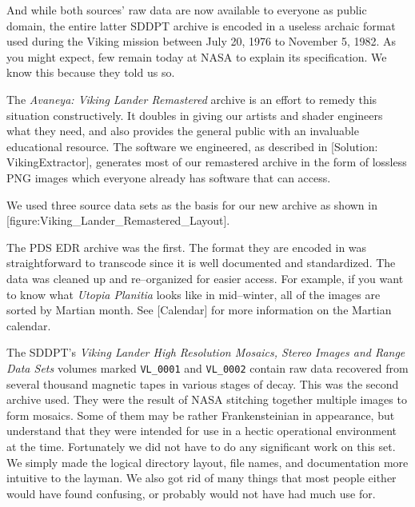 And while both sources' raw data are now available to everyone as public domain, the entire latter SDDPT archive is encoded in a useless archaic format used during the Viking mission between July 20, 1976 to November 5, 1982. As you might expect, few remain today at NASA to explain its specification. We know this because they told us so.

The {\it Avaneya: Viking Lander Remastered} archive is an effort to remedy this situation constructively. It doubles in giving our artists and shader engineers what they need, and also provides the general public with an invaluable educational resource. The software we engineered, as described in [Solution: VikingExtractor], generates most of our remastered archive in the form of lossless PNG images which everyone already has software that can access.

We used three source data sets as the basis for our new archive as shown in [figure:Viking_Lander_Remastered_Layout].
\crlf

    {}

The PDS EDR archive was the first. The format they are encoded in was straightforward to transcode since it is well documented and standardized. The data was cleaned up and re--organized for easier access. For example, if you want to know what {\it Utopia Planitia} looks like in mid--winter, all of the images are sorted by Martian month. See [Calendar] for more information on the Martian calendar.

The SDDPT's {\it Viking Lander High Resolution Mosaics, Stereo Images and Range Data Sets} volumes marked {\tt VL_0001} and {\tt VL_0002} contain raw data recovered from several thousand magnetic tapes in various stages of decay. This was the second archive used. They were the result of NASA stitching together multiple images to form mosaics. Some of them may be rather Frankensteinian in appearance, but understand that they were intended for use in a hectic operational environment at the time. Fortunately we did not have to do any significant work on this set. We simply made the logical directory layout, file names, and documentation more intuitive to the layman. We also got rid of many things that most people either would have found confusing, or probably would not have had much use for.


